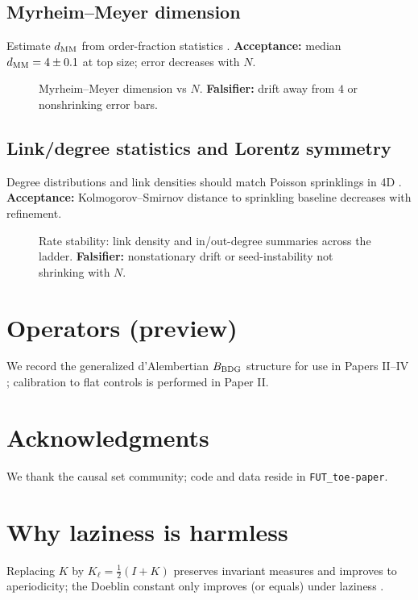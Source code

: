 \subsection{Myrheim--Meyer dimension}
Estimate $d_{\rm MM}$ from order-fraction statistics \citep{Myrheim1978,Meyer1988Dim}.
\textbf{Acceptance:} median $d_{\rm MM}=4\pm0.1$ at top size; error decreases with $N$.

\begin{figure}[H]\centering
{}
\caption{Myrheim--Meyer dimension vs $N$. \textbf{Falsifier:} drift away from $4$ or nonshrinking error bars.}
\end{figure}

\subsection{Link/degree statistics and Lorentz symmetry}
Degree distributions and link densities should match Poisson sprinklings in 4D \citep{Bombelli1987}.
\textbf{Acceptance:} Kolmogorov–Smirnov distance to sprinkling baseline decreases with refinement.

\begin{figure}[H]\centering
{}
\caption{Rate stability: link density and in/out-degree summaries across the ladder. \textbf{Falsifier:} nonstationary drift or seed-instability not shrinking with $N$.}
\end{figure}

\section{Operators (preview)}
We record the generalized d'Alembertian $B_{\rm BDG}$ structure for use in Papers II–IV \citep{AslanbeigiEtAl2014}; calibration to flat controls is performed in Paper II.

\section*{Acknowledgments}
We thank the causal set community; code and data reside in \texttt{FUT\_toe-paper}.

\appendix

\section{Why laziness is harmless}
Replacing $K$ by $K_\ell=\tfrac12(I+K)$ preserves invariant measures and improves to aperiodicity; the Doeblin constant only improves (or equals) under laziness \cite{LevinPeresWilmer2009,MeynTweedie2009}.

